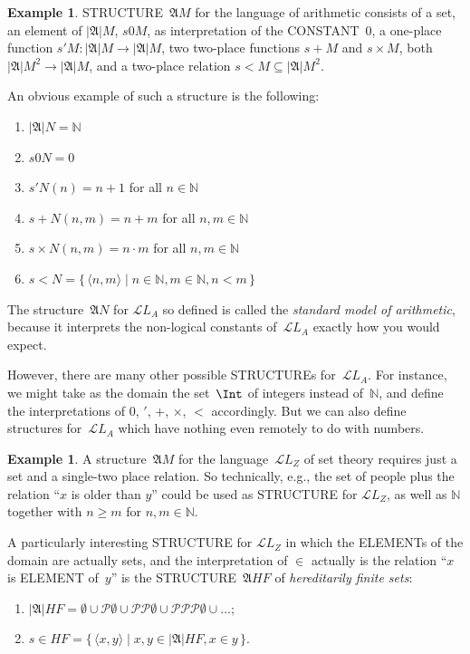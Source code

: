 \documentclass[10pt,a4paper]{article}
\newcommand*{\olup}[1]{\MakeUppercase{#1}}
\theoremstyle{plain}
\theoremstyle{definition}
\newtheorem{ex}[thm]{Example}
\theoremstyle{remark}
\providecommand{\Obj}{}
\providecommand{\Struct}{\ensuremath{\mathfrak{A}}}
\providecommand{\Domain}{\ensuremath{|\mathfrak{A}|}}
\providecommand{\Assign}{\ensuremath{s}}
\providecommand{\Lang}{\ensuremath{\mathcal{L}}}
\providecommand{\tuple}[1]{\langle #1 \rangle}
\providecommand{\Nat}{\ensuremath{\mathbb{N}}}
\providecommand{\Pow}{\mathcal{P}}
\providecommand{\Setabs}[2]{\{\, #1 \mid #2 \,\}}
\begin{document}
\begin{ex}
\olup{structure}~$\Struct M$ for the language of arithmetic consists of a
  set, an element of $\Domain M$, $\Assign{\Obj 0}{M}$, as
  interpretation of the \olup{constant}~$\Obj 0$, a one-place function
  $\Assign{\Obj \prime}{M} \colon \Domain{M} \to \Domain M$, two
  two-place functions $\Assign{\Obj +}{M}$ and $\Assign{\Obj
    \times}{M}$, both $\Domain M^2 \to \Domain M$, and a two-place
  relation $\Assign{\Obj <}{M} \subseteq \Domain{M}^2$.

An obvious example of such a structure is the following:
\begin{enumerate}
\item $\Domain N = \Nat$
\item $\Assign{\Obj 0}{N} = 0$
\item $\Assign{\Obj \prime}{N}(n) = n + 1$ for all $n \in \Nat$
\item $\Assign{\Obj +}{N}(n, m) = n + m$ for all $n, m \in \Nat$
\item $\Assign{\Obj \times}{N}(n, m) = n\cdot m$ for all $n, m \in \Nat$
\item $\Assign{\Obj <}{N} = \Setabs{\tuple{n, m}}{n \in \Nat, m \in
  \Nat, n < m}$
\end{enumerate}
The structure~$\Struct N$ for $\Lang L_A$ so defined is called the
\emph{standard model of arithmetic}, because it interprets the
non-logical constants of~$\Lang L_A$ exactly how you would expect.

However, there are many other possible \olup{structure}s for~$\Lang
L_A$. For instance, we might take as the domain the set~$\Int$ of
integers instead of~$\Nat$, and define the interpretations of $\Obj
0$, $\Obj \prime$, $\Obj +$, $\Obj \times$, $\Obj <$ accordingly.  But
we can also define structures for~$\Lang L_A$ which have nothing even
remotely to do with numbers.
\end{ex}

\begin{ex}
A structure~$\Struct M$ for the language~$\Lang L_Z$ of set theory requires
just a set and a single-two place relation. So technically, e.g., the
set of people plus the relation ``$x$ is older than $y$'' could be
used as \olup{structure} for $\Lang L_Z$, as well as $\Nat$ together
with $n \ge m$ for $n, m \in \Nat$.

A particularly interesting \olup{structure} for $\Lang L_Z$ in which the
\olup{element}s of the domain are actually sets, and the interpretation
of $\Obj \in$ actually is the relation ``$x$ is \olup{element} of~$y$''
is the \olup{structure}~$\Struct{{HF}}$ of \emph{hereditarily finite sets}:
\begin{enumerate}
\item $\Domain{{{HF}}} = \emptyset \cup \Pow{\emptyset} \cup
  \Pow{\Pow{\emptyset}} \cup \Pow{\Pow{\Pow{\emptyset}}} \cup \dots$;
\item $\Assign{\Obj \in}{{{HF}}} = \Setabs{\tuple{x, y}}{x, y \in
  \Domain{{{HF}}}, x \in y}$.
\end{enumerate}
\end{ex}
\end{document}
